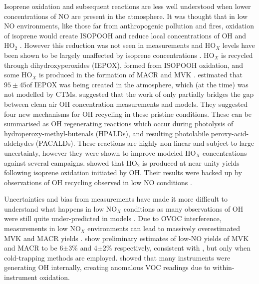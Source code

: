       Isoprene oxidation and subsequent reactions are less well understood when lower concentrations of NO are present in the atmosphere.
      It was thought that in low NO environments, like those far from anthropogenic pollution and fires, oxidation of isoprene would create ISOPOOH and reduce local concentrations of OH and HO$_2$ \parencite{Guenther2000,Paulot2009b}.
      However this reduction was not seen in measurements and HO$_X$ levels have been shown to be largely unaffected by isoprene concentrations \parencite{Paulot2009b}.
      HO$_X$ is recycled through dihydroxyperoxides (IEPOX), formed from ISOPOOH oxidation, and some HO$_X$ is produced in the formation of MACR and MVK \parencite{Paulot2009b}.
      \textcite{Paulot2009b} estimated that $95 \pm 45$\tgpyr of IEPOX was being created in the atmosphere, which (at the time) was not modelled by CTMs.
      \textcite{Peeters2010} suggested that the work of \textcite{Paulot2009b} only partially bridges the gap between clean air OH concentration measurements and models.
      They suggested four new mechanisms for OH recycling in these pristine conditions.
      These can be summarised as OH regenerating reactions which occur during photolysis of hydroperoxy-methyl-butenals (HPALDs), and resulting photolabile peroxy-acid-aldehydes (PACALDs).
      These reactions are highly non-linear and subject to large uncertainty, however they were shown to improve modeled HO$_X$ concentrations against several campaigns.
      \textcite{Peeters2010} showed that HO$_2$ is produced at near unity yields following isoprene oxidation initiated by OH.
      Their results were backed up by observations of OH recycling observed in low NO conditions \parencite{Crounse2012}.
      
      
      Uncertainties and bias from measurements have made it more difficult to understand what happens in low NO$_X$ conditions as many observations of OH were still quite under-predicted in models \parencite{Mao2012}.
      Due to OVOC interference, measurements in low NO$_X$ environments can lead to massively overestimated MVK and MACR yields \parencite{Nguyen2014}.
      \textcite{Nguyen2014} show preliminary estimates of low-NO yields of MVK and MACR to be 6$\pm3\%$ and 4$\pm2\%$ respectively, consistent with \textcite{Liu2013}, but only when cold-trapping methods are employed.
      \textcite{Mao2012} showed that many instruments were generating OH internally, creating anomalous VOC readings due to within-instrument oxidation.
      
